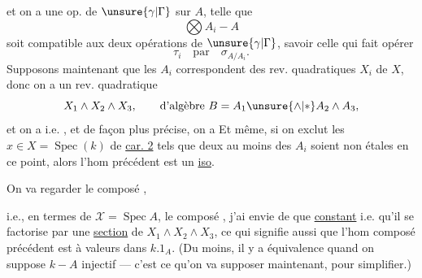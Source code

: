 et  on a une  op. de $\unsure{\gamma|\Gamma}$ sur $A$, telle que
\[
 \bigotimes A_i\mathbin{-}A
\]
soit compatible aux deux opérations de $\unsure{\gamma|\Gamma}$, savoir celle qui fait opérer
\[
 \tau_i\quad\text{par}\quad\sigma_{A/A_i}.
\]
Supposons maintenant que les $A_i$ correspondent  des rev. quadratiques $X_i$ de $X$, donc on a un rev. quadratique
\[
 X_1\wedge X_2\wedge X_3,\qquad\text{d'algèbre }B=A_1\unsure{\wedge|*}A_2\wedge A_3,
\]
et on a
i.e.
,
et de façon plus précise, on a
Et même, si on exclut les $x\in X=\operatorname{Spec}(k)$ de \uline{car. 2} tels que deux au moins des $A_i$ soient non étales en ce point, alors l'hom précédent est un \uline{iso}.

On va regarder le composé
, 

i.e., en termes de $\mathcal X=\operatorname{Spec}A$, le composé
,
j'ai envie de  que  \uline{constant} i.e. qu'il se factorise par une \uline{section} de $X_1\wedge X_2\wedge X_3$, ce qui signifie aussi que l'hom composé précédent
est à valeurs dans $k.1_A$. (Du moins, il y a équivalence quand on suppose $k\mathbin{-}A$ injectif --- c'est ce qu'on va supposer maintenant, pour simplifier.)

